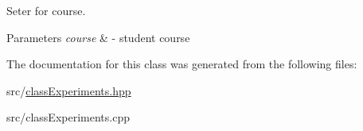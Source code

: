 Seter for course. 


\begin{DoxyParams}{Parameters}
{\em course} & -\/ student course \\
\hline
\end{DoxyParams}


The documentation for this class was generated from the following files\+:\begin{DoxyCompactItemize}
\item 
src/\hyperlink{classExperiments_8hpp}{class\+Experiments.\+hpp}\item 
src/class\+Experiments.\+cpp\end{DoxyCompactItemize}
